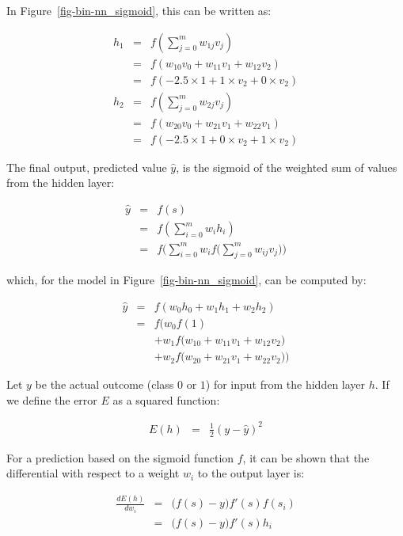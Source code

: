 \documentclass[
  letterpaper,
]{scrbook}
\begin{document}
In Figure~\ref{fig-bin-nn_sigmoid}, this can be written as:

\[\begin{aligned}
  h_1
  & = & f(\sum_{j=0}^{m} w_{1j} v_j) \\
  & = & f(w_{10} v_0 + w_{11} v_1 + w_{12} v_2) \\
  & = & f(-2.5\times1 + 1\times v_2 + 0\times v_2) \\
  h_2
  & = & f(\sum_{j=0}^{m} w_{2j} v_j) \\
  & = & f(w_{20} v_0 + w_{21} v_1 + w_{22} v_1) \\
  & = & f(-2.5\times1 + 0\times v_2 + 1\times v_2)
\end{aligned}\]

The final output, predicted value \(\hat{y}\), is the sigmoid of the
weighted sum of values from the hidden layer:

\[\begin{aligned}
  \hat{y}
  & = & f(s) \\
  & = & f(\sum_{i=0}^{m} w_i h_i) \\
  & = & f\Big(\sum_{i=0}^{m} w_i f\big(\sum_{j=0}^{m} w_{ij} v_j\big)\Big)
\end{aligned}\]

which, for the model in Figure~\ref{fig-bin-nn_sigmoid}, can be computed
by:

\[\begin{aligned}
  \hat{y}
  & = & f(w_0 h_0 + w_1 h_1 + w_2 h_2) \\
  & = & f\Big(w_0 f(1) \\
  &   & + w_1 f\big(w_{10} + w_{11} v_1 + w_{12} v_2\big) \\
  &   & + w_2 f\big(w_{20} + w_{21} v_1 + w_{22} v_2\big)\Big)
\end{aligned}\]

Let \(y\) be the actual outcome (class \(0\) or \(1\)) for input from
the hidden layer \(h\). If we define the error \(E\) as a squared
function:

\[\begin{aligned}
  E(h) & = & \frac{1}{2} (y - \hat{y})^2
\end{aligned}\]

For a prediction based on the sigmoid function \(f\), it can be shown
that the differential with respect to a weight \(w_i\) to the output
layer is:

\[\begin{aligned}
  \frac{dE(h)}{dw_i}
  & = & \big( f(s) - y \big) f'(s) f(s_i) \\
  & = & \big( f(s) - y \big) f'(s) h_i
\end{aligned}\]
\end{document}
